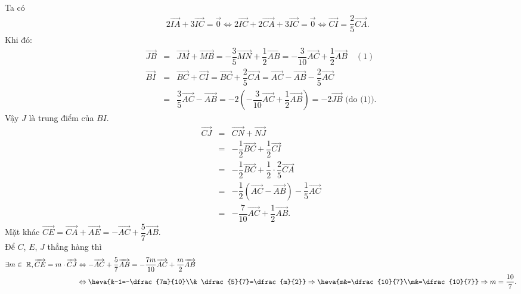 \begin{ex}
{\begin{itemchoice}
\begin{eqnarray*}
			\end{eqnarray*}
			\itemch Ta có 
			\begin{eqnarray*}
				&&2\overrightarrow{IA}+3\overrightarrow{IC}=\overrightarrow{0}\Leftrightarrow 2\overrightarrow{IC}+2\overrightarrow{CA}+3\overrightarrow{IC}=\overrightarrow{0}\Leftrightarrow \overrightarrow{CI}=\dfrac{2}{5}\overrightarrow{CA}. 
			\end{eqnarray*}
			Khi  đó:
			\begin{eqnarray*}
				 \overrightarrow{JB}&=&\overrightarrow{JM}+\overrightarrow{MB}=-\dfrac{3}{5}\overrightarrow{MN}+\dfrac{1}{2}\overrightarrow{AB}=-\dfrac{3}{10}\overrightarrow{AC}+\dfrac{1}{2}\overrightarrow{AB}\quad(1) \\
				\overrightarrow{BI}&=&\overrightarrow{BC}+\overrightarrow{CI}=\overrightarrow{BC}+\dfrac{2}{5}\overrightarrow{CA}=\overrightarrow{AC}-\overrightarrow{AB}-\dfrac{2}{5}\overrightarrow{AC}\\ 
				&=&\dfrac{3}{5}\overrightarrow{AC}-\overrightarrow{AB}=-2\left(-\dfrac{3}{10}\overrightarrow{AC}+\dfrac{1}{2}\overrightarrow{AB}\right)=-2\overrightarrow{JB}\text{ (do (1)).} 
			\end{eqnarray*}
			 Vậy $J$ là trung điểm của $BI$.
			\itemch \begin{eqnarray*}
			\overrightarrow{CJ}&=&\overrightarrow{CN}+\overrightarrow{NJ}\\ 
			 &=&-\dfrac{1}{2}\overrightarrow{BC}+\dfrac{1}{2}\overrightarrow{CI}\\
			 &=&-\dfrac{1}{2}\overrightarrow{BC}+\dfrac{1}{2}\cdot\dfrac{2}{5}\overrightarrow{CA}\\
			&=&-\dfrac{1}{2}(\overrightarrow{AC}-\overrightarrow{AB})-\dfrac{1}{5}\overrightarrow{AC}\\ 
			 &=&-\dfrac{7}{10}\overrightarrow{AC}+\dfrac{1}{2}\overrightarrow{AB}.
		\end{eqnarray*}
		Mặt khác  $\overrightarrow{CE}=\overrightarrow{CA}+\overrightarrow{AE}=-\overrightarrow{AC}+\dfrac{5}{7}\overrightarrow{AB}$.\\
		Để $C$,  $E$, $J$ thẳng hàng thì
		$$\begin{aligned}
		\exists m\in\; \mathbb{R},\overrightarrow{CE}=m\cdot\overrightarrow{CJ}&\Leftrightarrow  -\overrightarrow{AC}+\dfrac{5}{7}\overrightarrow{AB}=-\dfrac{7m}{10}\overrightarrow{AC}+\dfrac{m}{2}\overrightarrow{AB}\\
		&\Leftrightarrow  \heva{&-1=-\dfrac{7m}{10}\\&
		\dfrac{5}{7}=\dfrac{m}{2}}\Rightarrow \heva{m&=\dfrac{10}{7}\\m&=\dfrac{10}{7}}\Rightarrow  m=\dfrac{10}{7}.
	\end{aligned}
	 $$
\end{itemchoice}}
\end{ex}


